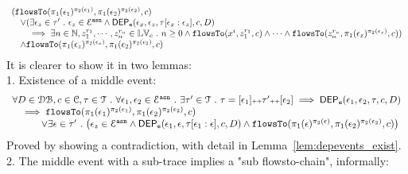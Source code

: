 %
$$
\begin{array}{l}
(\mathtt{flowsTo}(\pi_1(\mathtt{\epsilon}_1)^{\pi_2(\mathtt{\epsilon}_1)}, \pi_1(\mathtt{\epsilon}_2)^{\pi_2(\mathtt{\epsilon}_2)}, c)
\\ \quad 
\lor 
(\exists \mathtt{\epsilon}_z \in \mathtt{\tau}' ~.~ \mathtt{\epsilon}_z \in \mathcal{E}^{\mathtt{{asn}}} \land 
    \mathsf{DEP_{\mathtt{e}}}(\mathtt{\epsilon}_x, \mathtt{\epsilon}_z, \mathtt{\tau}[\mathtt{\epsilon}_x: \mathtt{\epsilon}_z], c, D)
    \\ \qquad 
    \implies 
    \exists n \in \mathbb{N}, z_1^{r_1}, \cdots, z_n^{r_n} \in \mathbb{LV}_{{c}} ~.~ n \geq 0 \land
\mathtt{flowsTo}(x^i,  z_1^{r_1}, c) 
\land \cdots \land \mathtt{flowsTo}(z_n^{r_n},  \pi_1(\mathtt{\epsilon}_z)^{\pi_2(\mathtt{\epsilon}_z)}, c)
    )
    \\ \quad
    \land 
    \mathtt{flowsTo}(\pi_1(\mathtt{\epsilon}_z)^{\pi_2(\mathtt{\epsilon}_z)}, \pi_1(\mathtt{\epsilon}_2)^{\pi_2(\mathtt{\epsilon}_2)}, c) 
\end{array}
$$
%
It is clearer to show it in two lemmas:
\\
1. Existence of a middle event:
\[
	\begin{array}{l}
		\forall D \in \dbdom , c \in \cdom, \trace \in \mathcal{T} \st \forall \event_1, \event_2 \in \eventset^{\asn} \st
		 \exists \trace' \in \mathcal{T} \st \trace = [\event_1] \tracecat \trace' \tracecat [\event_2]
		\implies
		\eventdep(\event_1, \event_2, \trace, c, D) 
		\\ \quad 
		\implies 
		\flowsto(\pi_1(\event_1)^{\pi_2(\event_1)}, \pi_1(\event_2)^{\pi_2(\event_2)}, c) 
		\\ \qquad \quad \lor
		\exists \event \in \trace' \st 
		\left( 		\event_z \in \eventset^{\asn} \land 
			\eventdep(\event_1, \event, \trace[\event_1:\event], c, D)
		\land 
		\flowsto(\pi_1(\event)^{\pi_2(\event)}, \pi_1(\event_2)^{\pi_2(\event_2)}, c) 
	\right) 
	\end{array}
\]
Proved by showing a contradiction, with detail in Lemma~\ref{lem:depevents_exist}.
%
\\
2. The middle event with a sub-trace implies a "sub flowsto-chain", informally:
